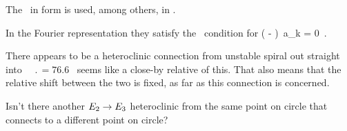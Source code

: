 \bigskip

The \KSe\ in  form  is used, among others, in
.

\bigskip

In the Fourier representation they satisfy
the \eqv\ condition for 
\beq
\left(  -   \right)\, a_k
  = 0
\,.
\label{eq:stfks}
\eeq

\bigskip

There appears to be a heteroclinic connection from 
{\eqv} unstable spiral out straight into ~{\eqv}
$\period{} = 76.6$ \rpo\ seems like a close-by relative of
this. That also means that the relative shift between the two
{\eqva} is fixed, as far as this connection is concerned.

%
Isn't there another $ E_{2} \to E_{3} $ heteroclinic from
the same point on   circle that connects to a different
point on  circle?

\bigskip


